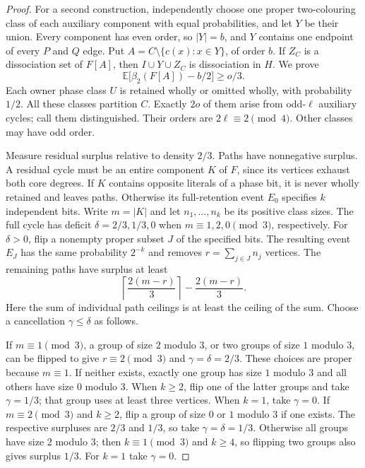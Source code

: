 \documentclass[11pt]{article}
\newcommand{\diss}{\beta_2}
\begin{document}
\begin{proof}
For a second construction, independently choose one proper two-colouring
class of each auxiliary component with equal probabilities, and let $Y$
be their union. Every component has even order, so $|Y|=b$, and $Y$
contains one endpoint of every $P$ and $Q$ edge.
Put $A=C\setminus\{c(x):x\in Y\}$, of order $b$.
If $Z_C$ is a dissociation set of $F[A]$, then $I\cup Y\cup Z_C$
is dissociation in $H$. We prove
\begin{equation}\label{eq:phase-sharp}
 \mathbb E\bigl[\diss(F[A])-b/2\bigr]\ge o/3.
\end{equation}
Each owner phase class $U$ is retained wholly or omitted wholly, with
probability $1/2$. All these classes partition $C$. Exactly $2o$ of
them arise from odd-$\ell$ auxiliary cycles; call them distinguished.
Their orders are $2\ell\equiv2\pmod4$. Other classes may have odd order.

Measure residual surplus relative to density $2/3$.
Paths have nonnegative surplus. A residual cycle must be an entire
component $K$ of $F$, since its vertices exhaust both core degrees.
If $K$ contains opposite literals of a phase bit, it is never wholly
retained and leaves paths. Otherwise its full-retention event $E_0$
specifies $k$ independent bits. Write $m=|K|$ and let $n_1,\ldots,n_k$
be its positive class sizes. The full cycle has deficit
$\delta=2/3,1/3,0$ when $m\equiv1,2,0\pmod3$, respectively.
For $\delta>0$, flip a nonempty proper subset $J$ of the specified bits.
The resulting event $E_J$ has the same probability $2^{-k}$ and removes
$r=\sum_{j\in J}n_j$ vertices. The remaining paths have surplus at least
\[
 \left\lceil\frac{2(m-r)}3\right\rceil-\frac{2(m-r)}3.
\]
Here the sum of individual path ceilings is at least the ceiling of
the sum. Choose a cancellation $\gamma\le\delta$ as follows.

If $m\equiv1\pmod3$, a group of size $2$ modulo $3$, or two groups
of size $1$ modulo $3$, can be flipped to give $r\equiv2\pmod3$ and
$\gamma=\delta=2/3$. These choices are proper because $m\equiv1$.
If neither exists, exactly one group has size $1$ modulo $3$ and all
others have size $0$ modulo $3$. When $k\ge2$, flip one of the latter
groups and take $\gamma=1/3$; that group uses at least three vertices.
When $k=1$, take $\gamma=0$.
If $m\equiv2\pmod3$ and $k\ge2$, flip a group of size $0$ or $1$
modulo $3$ if one exists. The respective surpluses are $2/3$ and $1/3$,
so take $\gamma=\delta=1/3$. Otherwise all groups have size $2$ modulo
$3$; then $k\equiv1\pmod3$ and $k\ge4$, so flipping two groups also
gives surplus $1/3$. For $k=1$ take $\gamma=0$.


\end{proof}
\end{document}
